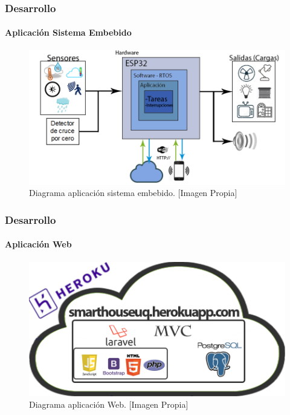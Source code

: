 \begin{frame}
\frametitle{Desarrollo}
\framesubtitle{Aplicación Sistema Embebido}

\begin{figure}
	\centering
	\caption{Diagrama aplicación sistema embebido. [Imagen Propia]}
	\label{fig:baplicacion}
	\includegraphics[width=0.7\linewidth]{Imagenes/B_Aplicacion}
\end{figure}


\end{frame}

\begin{frame}
\frametitle{Desarrollo}
\framesubtitle{Aplicación Web}

\begin{figure}
	\centering
	\caption{Diagrama aplicación Web. [Imagen Propia]}
	\label{fig:bappweb}
	\includegraphics[width=0.7\linewidth]{Imagenes/B_ImplAPPweb}
\end{figure}


\end{frame}